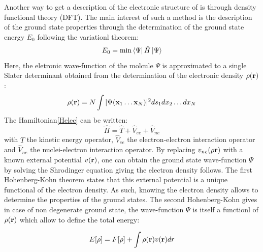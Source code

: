 \documentclass[10pt]{report}
\numberwithin{equation}{section}
\begin{document}
Another way to get a description of the electronic structure of is through density functional theory (DFT).
The main interest of such a method is the description of the ground state properties through the determination of the ground state energy $E_0$ following the variationl theorem:
\begin{equation}
    E_0 = \min \bra{\Psi} \hat{H} \ket{\Psi}
\end{equation}
Here, the eletronic wave-function of the molcule $\Psi$ is approximated to a single Slater determinant obtained from the determination of the electronic density $\rho(\vb r)$:
\begin{equation}
    \rho(\vb r)=N\int |\Psi(\vb x_1 \ldots \vb x_N)|^2 ds_1 dx_2 \ldots dx_N
\end{equation}
The Hamiltonian\ref{Helec} can be written:
\begin{equation}\label{Hop}
    \hat{H}=\hat{T} + \hat{V}_{ee} + \hat{V}_{ne}
\end{equation} 
with $\hat{T}$ the kinetic energy operator, $\hat{V}_{ee}$ the electron-electron interaction operator and $\hat{V}_{ne}$ the nuclei-electron interaction operator. 
By replacing $v_{ne}(\rho\vb r)$ with a known external potential $v(\vb r)$, one can obtain the ground state wave-function $\Psi$ by solving the Shrodinger equation giving the electron density follows.
The first Hohenberg-Kohn theorem states that this external potential is a unique functional of the electron density.
As such, knowing the electron density allows to determine the properties of the ground states.
The second Hohenberg-Kohn gives in case of non degenerate ground state, the wave-function $\Psi$ is itself a functionl of $\rho(\vb r)$ which allow to define the total energy:

\begin{equation}\label{EnergyDFT}
    E[\rho]= F[\rho]+ \int \rho(\vb r) v(\vb r)dr
\end{equation}
\end{document}
